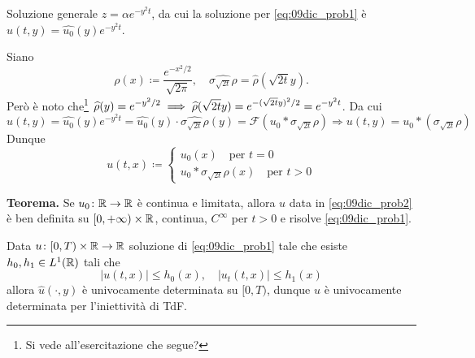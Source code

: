Soluzione generale $z = \alpha e^{-y^2 t}$, da cui la soluzione per \eqref{eq:09dic_prob1} è $\hat{u}(t,y) = \hat{u_0}(y) e^{-y^2 t}$.

Siano 
%
$$
	\rho(x) \coloneqq \frac{e^{-x^2 / 2}}{\sqrt{2\pi}}, \quad  \hat{\sigma_{\sqrt{2t}}\rho} = \hat{\rho}(\sqrt{2t}y).
$$
%
Però è noto che\footnote{Si vede all'esercitazione che segue?} $\displaystyle \widehat{\rho}(y) = e^{-y^2/2} \implies \widehat{\rho}(\sqrt{2t}y) = e^{-(\sqrt{2t}y)^2 / 2} = e^{-y^2 t}$. Da cui
%
$$
	\hat{u}(t,y) = \hat{u_0} (y) e^{-y^2t} = \hat{u_0}(y) \cdot \hat{\sigma_{\sqrt{2t}} \rho}(y)
	= \mathcal{F}(u_0 \ast \sigma_{\sqrt{2t}} \rho)
	\Longrightarrow u(t,y) = u_0 \ast \left( \sigma_{\sqrt{2t}} \rho \right)
$$
%
Dunque
%
\begin{equation}
\label{eq:09dic_prob2} \tag{$\ast$}
	u(t,x) \coloneqq 
	\begin{cases}
		u_0(x) \quad \text{per } t=0 \\
		u_0 \ast \sigma_{\sqrt{2t}} \rho(x) \quad \text{per } t > 0
	\end{cases} 
\end{equation}

\textbf{Teorema.} Se $u_0 \colon \mathbb R \to \mathbb R$ è continua e limitata, allora $u$ data in \eqref{eq:09dic_prob2} è ben definita su $[0,+\infty) \times \mathbb R$, continua, $C^\infty$ per $t>0$ e risolve \eqref{eq:09dic_prob1}.

\vss

Data $u \colon [0,T) \times \mathbb R \to \mathbb R$ soluzione di \eqref{eq:09dic_prob1} tale che esiste $h_0,h_1 \in L^1(\mathbb R)$ tali che 
%
$$
	|u(t,x)| \leq h_0(x), \quad |u_t(t,x)| \leq h_1(x)
$$
%
allora $\hat{u}(\cdot,y)$ è univocamente determinata su $[0,T)$, dunque $u$ è univocamente determinata per l'iniettività di TdF.

